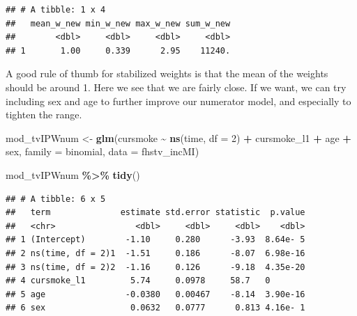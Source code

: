 \documentclass[
]{book}
\newenvironment{Shaded}{\begin{snugshade}}{\end{snugshade}}
\newcommand{\AttributeTok}[1]{\textcolor[rgb]{0.13,0.29,0.53}{#1}}
\newcommand{\DecValTok}[1]{\textcolor[rgb]{0.00,0.00,0.81}{#1}}
\newcommand{\FunctionTok}[1]{\textcolor[rgb]{0.13,0.29,0.53}{\textbf{#1}}}
\newcommand{\NormalTok}[1]{#1}
\newcommand{\OtherTok}[1]{\textcolor[rgb]{0.56,0.35,0.01}{#1}}
\newcommand{\SpecialCharTok}[1]{\textcolor[rgb]{0.81,0.36,0.00}{\textbf{#1}}}
\begin{document}
\begin{verbatim}
## # A tibble: 1 x 4
##   mean_w_new min_w_new max_w_new sum_w_new
##        <dbl>     <dbl>     <dbl>     <dbl>
## 1       1.00     0.339      2.95    11240.
\end{verbatim}

A good rule of thumb for stabilized weights is that the mean of the weights should be around 1. Here we see that we are fairly close. If we want, we can try including sex and age to further improve our numerator model, and especially to tighten the range.

\begin{Shaded}
\begin{Highlighting}[]
\NormalTok{mod\_tvIPWnum }\OtherTok{\textless{}{-}} \FunctionTok{glm}\NormalTok{(cursmoke }\SpecialCharTok{\textasciitilde{}} \FunctionTok{ns}\NormalTok{(time, }\AttributeTok{df =} \DecValTok{2}\NormalTok{) }\SpecialCharTok{+}\NormalTok{ cursmoke\_l1 }\SpecialCharTok{+} 
\NormalTok{                      age }\SpecialCharTok{+}\NormalTok{ sex, }\AttributeTok{family =}\NormalTok{ binomial, }
                    \AttributeTok{data =}\NormalTok{ fhstv\_incMI)}

\NormalTok{mod\_tvIPWnum }\SpecialCharTok{\%\textgreater{}\%}
  \FunctionTok{tidy}\NormalTok{()}
\end{Highlighting}
\end{Shaded}

\begin{verbatim}
## # A tibble: 6 x 5
##   term              estimate std.error statistic  p.value
##   <chr>                <dbl>     <dbl>     <dbl>    <dbl>
## 1 (Intercept)        -1.10     0.280      -3.93  8.64e- 5
## 2 ns(time, df = 2)1  -1.51     0.186      -8.07  6.98e-16
## 3 ns(time, df = 2)2  -1.16     0.126      -9.18  4.35e-20
## 4 cursmoke_l1         5.74     0.0978     58.7   0       
## 5 age                -0.0380   0.00467    -8.14  3.90e-16
## 6 sex                 0.0632   0.0777      0.813 4.16e- 1
\end{verbatim}
\end{document}
